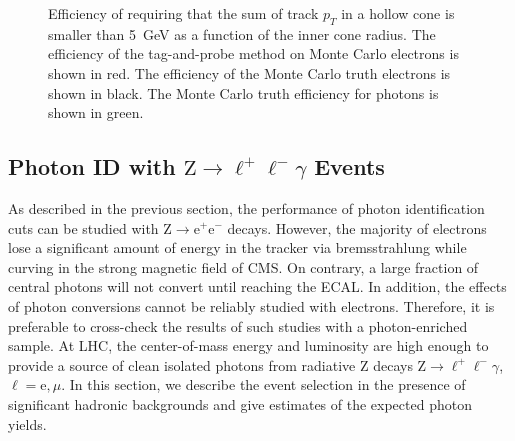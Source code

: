 \documentclass{cmspaper}
\begin{document}
\begin{figure}[hbtp]
  \begin{center}
    \caption{Efficiency of requiring that the sum of track $p_T$ in a hollow cone is smaller than 5~GeV as a function of the inner cone radius.  The efficiency of the tag-and-probe method on Monte Carlo electrons is shown in red.  The efficiency of the Monte Carlo truth electrons is shown in black.  The Monte
Carlo truth efficiency for photons is shown in green.}
    \label{fig:innerConeScan}
  \end{center}
\end{figure}

\subsection{Photon ID with \boldmath $\mathrm{Z}\to \ell^+\ell^- \gamma$ Events}
As described in the previous section, the
performance of photon identification cuts  can be  studied with $\mathrm{Z} \to\mathrm{e}^+\mathrm{e}^-$
decays. However, the majority of electrons lose a significant amount of energy in the tracker via bremsstrahlung while curving 
in the strong magnetic field of CMS. On contrary, a large fraction of central photons will not convert until reaching
the ECAL. In addition, the effects of photon conversions cannot be reliably studied
with electrons. Therefore, it is preferable to cross-check the results of such studies with a photon-enriched sample.
At LHC, the center-of-mass energy and luminosity are high enough to provide a source of clean isolated photons
 from radiative Z decays  $\mathrm{Z}\to \ell^+\ell^- \gamma$, $\ell =\mathrm{e},\mu$. 
In this section, we describe the event selection in the presence of significant
hadronic backgrounds and give  estimates of the expected photon yields.
\end{document}
